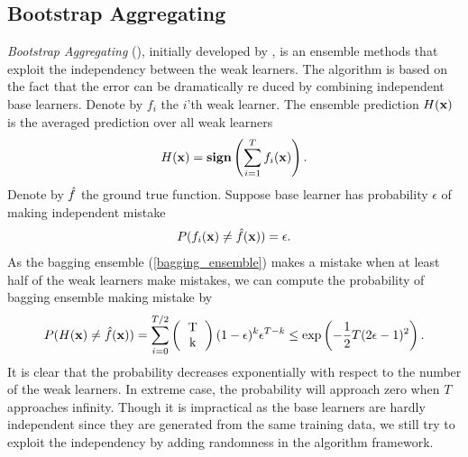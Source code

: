 {




%
\subsection{Bootstrap Aggregating}
\textit{Bootstrap Aggregating} (\bagging), initially developed by \citet{Breiman96bagging}, is an ensemble methods that exploit the independency between the weak learners.
The algorithm is based on the fact that the error can be dramatically re duced by combining independent base learners.
Denote by $f_i$ the $i$'th weak learner.
The ensemble prediction $H(\mathbf {x})$ is the averaged prediction over all weak learners
\begin{align}
	H(\mathbf {x}) = \textbf{sign}\left(\sum_{i=1}^{T}f_i(\mathbf {x})\right). \label{bagging_ensemble}
\end{align}
Denote by ${\hat{f}}$ the ground true function.
Suppose base learner has probability $\epsilon$ of making independent mistake
\begin{align*}
	P(f_i(\mathbf {x}) \ne {\hat{f}}(\mathbf {x})) = \epsilon.
\end{align*}
As the bagging ensemble (\ref{bagging_ensemble}) makes a mistake when at least half of the weak learners make mistakes, we can compute the probability of bagging ensemble making mistake by
\begin{align*}
	P(H(\vx)\neq\hatf(\vx)) = \sum_{i=0}^{T/2}\left(\begin{tabular}{cc}T\\k\end{tabular}\right)(1-\epsilon)^k\epsilon^{T-k} \le\exp\left(-\frac{1}{2}T(2\epsilon-1)^2\right).
\end{align*}
It is clear that the probability decreases exponentially with respect to the number of the weak learners.
In extreme case, the probability will approach zero when $T$ approaches infinity.
Though it is impractical as the base learners are hardly independent since they are generated from the same training data, we still try to exploit the independency by adding randomness in the algorithm framework.

}
